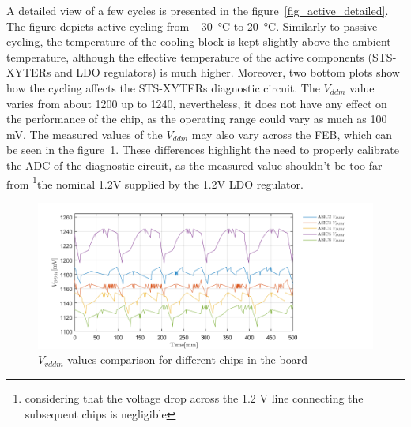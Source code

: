 A detailed view of a few cycles is presented in the figure~\ref{fig_active_detailed}. The figure depicts active cycling from \SI{-30}{\celsius} to \SI{20}{\celsius}. Similarly to passive cycling, the temperature of the cooling block is kept slightly above the ambient temperature, although the effective temperature of the active components (STS-XYTERs and \gls{LDO} regulators) is much higher. Moreover, two bottom plots show how the cycling affects the \gls{STS}-XYTERs diagnostic circuit. The $V_{ddm}$ value varies from about 1200 up to 1240, nevertheless, it does not have any effect on the performance of the chip, as the operating range could vary as much as 100 mV. The measured values of the $V_{ddm}$ may also vary across the \gls{FEB}, which can be seen in the figure~\ref{feb_vary}. These differences highlight the need to properly calibrate the ADC of the diagnostic circuit, as the measured value shouldn't be too far from \footnote{considering that the voltage drop across the 1.2 V line connecting the subsequent chips is negligible}{the nominal 1.2V} supplied by the 1.2V \gls{LDO} regulator. 
\begin{figure}[!h]
\centering
\includegraphics[width=0.9\columnwidth]{Chapter3/Cycling/Images/vddm_comp.png}
\caption{$V_{vddm}$ values comparison for different chips in the board}
\label{feb_vary}
\end{figure}

